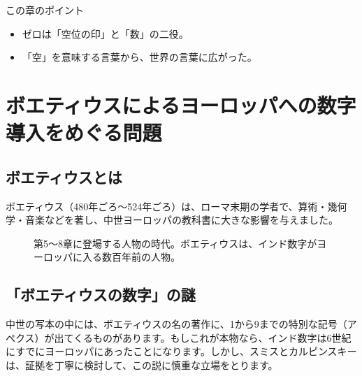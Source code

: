 \documentclass[a4paper,11pt,openany]{ltjsbook}
\begin{document}
\begin{pointbox}{この章のポイント}
\begin{itemize}[leftmargin=1.5em]
\item ゼロは「空位の印」と「数」の二役。
\item 「空」を意味する言葉から、世界の言葉に広がった。
\end{itemize}
\end{pointbox}

\chapter{ボエティウスによるヨーロッパへの数字導入をめぐる問題}

\section{ボエティウスとは}

ボエティウス（480年ごろ〜524年ごろ）は、ローマ末期の学者で、算術・幾何学・音楽などを著し、中世ヨーロッパの教科書に大きな影響を与えました。

\begin{figure}[htbp]
\centering
{}
\caption{第5〜8章に登場する人物の時代。ボエティウスは、インド数字がヨーロッパに入る数百年前の人物。}
\end{figure}

\section{「ボエティウスの数字」の謎}

中世の写本の中には、ボエティウスの名の著作に、1から9までの特別な記号（アペクス）が出てくるものがあります。もしこれが本物なら、インド数字は6世紀にすでにヨーロッパにあったことになります。しかし、スミスとカルピンスキーは、証拠を丁寧に検討して、この説に慎重な立場をとります。
\end{document}
